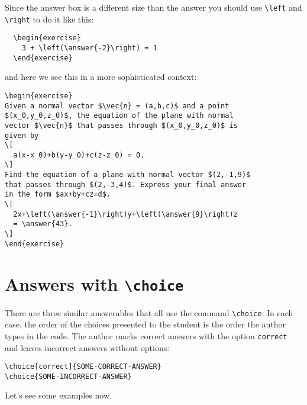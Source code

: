 \documentclass{ximera}
\begin{document}
Since the answer box is a different size than the answer you should use
\verb!\left! and \verb!\right! to do it like
this:
\begin{verbatim}
  \begin{exercise}
    3 + \left(\answer{-2}\right) = 1
  \end{exercise}
\end{verbatim}
and here we see this in a more sophisticated context:
\begin{verbatim}
\begin{exercise}
Given a normal vector $\vec{n} = (a,b,c)$ and a point
$(x_0,y_0,z_0)$, the equation of the plane with normal
vector $\vec{n}$ that passes through $(x_0,y_0,z_0)$ is
given by
\[
  a(x-x_0)+b(y-y_0)+c(z-z_0) = 0.
\]
Find the equation of a plane with normal vector $(2,-1,9)$
that passes through $(2,-3,4)$. Express your final answer
in the form $ax+by+cz=d$.
\[
  2x+\left(\answer{-1}\right)y+\left(\answer{9}\right)z
  = \answer{43}.
\]
\end{exercise}
\end{verbatim}

\section{Answers with \texttt{\textbackslash choice}}

There are three similar answerables that all use the command \verb!\choice!. In
each case, the order of the choices presented to the student is the order the
author types in the code. The author marks correct answers with the option
\verb!correct! and leaves incorrect answers without options:
\begin{verbatim}
\choice[correct]{SOME-CORRECT-ANSWER}
\choice{SOME-INCORRECT-ANSWER}
\end{verbatim}
Let's see some examples now.
\end{document}
